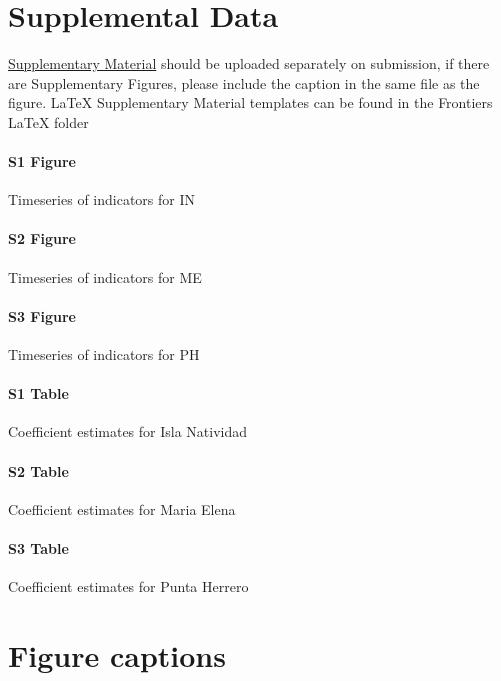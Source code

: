 \documentclass{frontiersSCNS}
\theoremstyle{definition}
\theoremstyle{definition}
\theoremstyle{definition}
\theoremstyle{remark}
\begin{document}
\section*{Supplemental Data}

\href{http://home.frontiersin.org/about/author-guidelines#SupplementaryMaterial}{Supplementary Material}
should be uploaded separately on submission, if there are Supplementary
Figures, please include the caption in the same file as the figure.
LaTeX Supplementary Material templates can be found in the Frontiers
LaTeX folder

\paragraph*{S1 Figure}
\label{S1_Figure}

Timeseries of indicators for IN

\paragraph*{S2 Figure}
\label{S2_Figure}

Timeseries of indicators for ME

\paragraph*{S3 Figure}
\label{S3_Figure}

Timeseries of indicators for PH

\paragraph*{S1 Table}
\label{S1_Table}

Coefficient estimates for Isla Natividad

\paragraph*{S2 Table}
\label{S2_Table}

Coefficient estimates for Maria Elena

\paragraph*{S3 Table}
\label{S3_Table}

Coefficient estimates for Punta Herrero



\section*{Figure captions}
\end{document}
